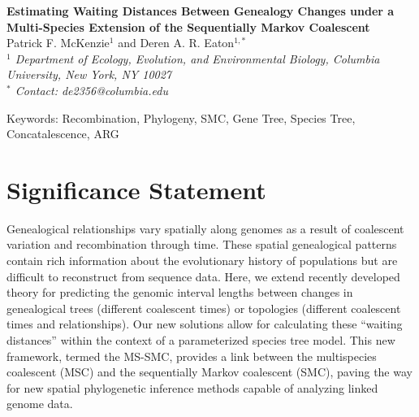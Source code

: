 \documentclass[11pt]{article}
\begin{document}
\begin{center}
	{\bf \Large
		Estimating Waiting Distances Between Genealogy Changes under a \\[0.25cm]
		Multi-Species Extension of the Sequentially Markov Coalescent
	}\\[0.5cm]

	Patrick F. McKenzie$^{1}$ and Deren A. R. Eaton$^{1, *}$\\[0.25cm]

	\emph{
	$^{1}$ Department of Ecology, Evolution, and Environmental Biology, Columbia University, New York, NY 10027\\[0.5cm]
	$^{*}$ Contact: de2356@columbia.edu\\[0.5cm]
	}
\end{center}

Keywords: Recombination, Phylogeny, SMC, Gene Tree, Species Tree, Concatalescence, ARG

\RaggedRight

\section*{Significance Statement}
Genealogical relationships vary spatially along genomes as a result of coalescent
 variation and recombination through time. These spatial genealogical patterns 
 contain rich information about the evolutionary history of populations but are 
 difficult to reconstruct from sequence data. Here, we extend recently developed 
 theory for predicting the genomic interval lengths between changes in 
 genealogical trees (different coalescent times) or topologies (different 
 coalescent times and relationships). Our new solutions allow for calculating 
 these “waiting distances” within the context of a parameterized species tree 
 model. This new framework, termed the MS-SMC, provides a link between the 
 multispecies coalescent (MSC) and the sequentially Markov coalescent (SMC), 
 paving the way for new spatial phylogenetic inference methods capable of 
 analyzing linked genome data.
\end{document}
